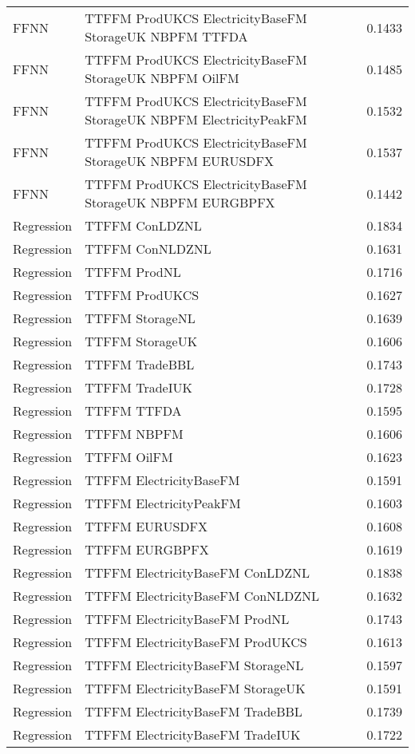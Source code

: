 \begin{table}[h!]
\begin{adjustbox}{max width=\textwidth}
\begin{tabular}{llr}
  FFNN & TTFFM ProdUKCS ElectricityBaseFM StorageUK NBPFM TTFDA & 0.1433 \\ 
  FFNN & TTFFM ProdUKCS ElectricityBaseFM StorageUK NBPFM OilFM & 0.1485 \\ 
  FFNN & TTFFM ProdUKCS ElectricityBaseFM StorageUK NBPFM ElectricityPeakFM & 0.1532 \\ 
  FFNN & TTFFM ProdUKCS ElectricityBaseFM StorageUK NBPFM EURUSDFX & 0.1537 \\ 
  FFNN & TTFFM ProdUKCS ElectricityBaseFM StorageUK NBPFM EURGBPFX & 0.1442 \\ 
  Regression & TTFFM ConLDZNL & 0.1834 \\ 
  Regression & TTFFM ConNLDZNL & 0.1631 \\ 
  Regression & TTFFM ProdNL & 0.1716 \\ 
  Regression & TTFFM ProdUKCS & 0.1627 \\ 
  Regression & TTFFM StorageNL & 0.1639 \\ 
  Regression & TTFFM StorageUK & 0.1606 \\ 
  Regression & TTFFM TradeBBL & 0.1743 \\ 
  Regression & TTFFM TradeIUK & 0.1728 \\ 
  Regression & TTFFM TTFDA & 0.1595 \\ 
  Regression & TTFFM NBPFM & 0.1606 \\ 
  Regression & TTFFM OilFM & 0.1623 \\ 
  Regression & TTFFM ElectricityBaseFM & 0.1591 \\ 
  Regression & TTFFM ElectricityPeakFM & 0.1603 \\ 
  Regression & TTFFM EURUSDFX & 0.1608 \\ 
  Regression & TTFFM EURGBPFX & 0.1619 \\ 
  Regression & TTFFM ElectricityBaseFM ConLDZNL & 0.1838 \\ 
  Regression & TTFFM ElectricityBaseFM ConNLDZNL & 0.1632 \\ 
  Regression & TTFFM ElectricityBaseFM ProdNL & 0.1743 \\ 
  Regression & TTFFM ElectricityBaseFM ProdUKCS & 0.1613 \\ 
  Regression & TTFFM ElectricityBaseFM StorageNL & 0.1597 \\ 
  Regression & TTFFM ElectricityBaseFM StorageUK & 0.1591 \\ 
  Regression & TTFFM ElectricityBaseFM TradeBBL & 0.1739 \\ 
  Regression & TTFFM ElectricityBaseFM TradeIUK & 0.1722 \\ 

\end{tabular}
\end{adjustbox}
\end{table}
